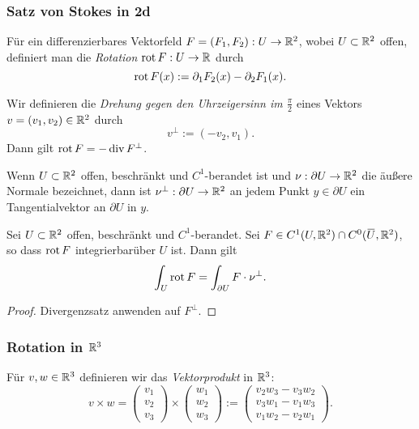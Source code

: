 \subsubsection{Satz von Stokes in 2d}
Für ein differenzierbares Vektorfeld $F=(F_1,F_2): U \to \mathbb{R}^2$, wobei $U \subset \mathbb{R}^2$ offen, definiert man die \emph{Rotation} $\operatorname{rot} F : U \to \mathbb{R}$ durch
\[ \operatorname{rot} F(x) := \partial_1 F_2(x) - \partial_2 F_1(x). \]

Wir definieren die \emph{Drehung gegen den Uhrzeigersinn im $\frac{\pi}{2}$} eines Vektors $v = (v_1, v_2) \in \mathbb{R}^2$ durch
\[ v^\perp := (-v_2, v_1). \]
Dann gilt $\operatorname{rot} F = - \operatorname{div} F^\perp$.

Wenn $U \subset \mathbb{R}^2$ offen, beschränkt und $C^1$-berandet ist und $\nu:\partial U \to \mathbb{R}^2$ die äußere Normale bezeichnet, dann ist $\nu^\perp:\partial U \to \mathbb{R}^2$ an jedem Punkt $y \in \partial U$ ein Tangentialvektor an $\partial U$ in $y$.

\begin{thm}
 Sei $U \subset \mathbb{R}^2$ offen, beschränkt und $C^1$-berandet. Sei $F \in C^1( U, \real^2) \cap C^0( \obar{U}, \real^2 )$, so dass $\operatorname{rot} F$ integrierbar\footnotemark über $U$ ist. Dann gilt
 \[ \int_U \operatorname{rot} F = \int_{\partial U} F \cdot \nu^\perp. \]
\end{thm}

\begin{proof}
 Divergenzsatz anwenden auf $F^\perp$.
\end{proof}

\subsubsection{Rotation in \texorpdfstring{$\mathbb{R}^3$}{IR3}}
Für $v,w \in \mathbb{R}^3$ definieren wir das \emph{Vektorprodukt} in $\mathbb{R}^3$:
\[ v \times w = 
   \begin{pmatrix} v_1 \\ v_2 \\ v_3 \end{pmatrix} \times
   \begin{pmatrix} w_1 \\ w_2 \\ w_3 \end{pmatrix} :=
   \begin{pmatrix} v_2 w_3 - v_3 w_2 \\ v_3 w_1 - v_1 w_3 \\ v_1 w_2 - v_2 w_1 \end{pmatrix}. \]

